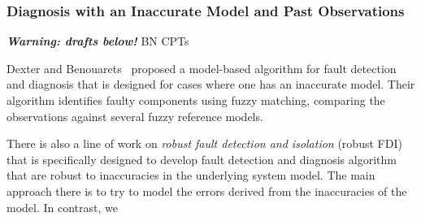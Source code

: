 \documentclass[12pt]{article}
\newcommand{\note}[1]{\textbf{\textit{#1}}}
\begin{document}





\subsubsection{Diagnosis with an Inaccurate Model and Past Observations}
\note{Warning: drafts below!}
BN 
CPTs



Dexter and Benouarets~\cite{dexter1997model} proposed a model-based algorithm for fault detection and diagnosis that is designed for cases where one has an inaccurate model. Their algorithm identifies faulty components using fuzzy matching, comparing the observations against several fuzzy reference models. 

There is also a line of work on {\em robust fault detection and isolation} (robust FDI)~\cite{chen2012robust} that is specifically designed to develop fault detection and diagnosis algorithm that are robust to inaccuracies in the underlying system model. The main approach there is to try to model the errors derived from the inaccuracies of the model. In contrast, we 





\end{document}
